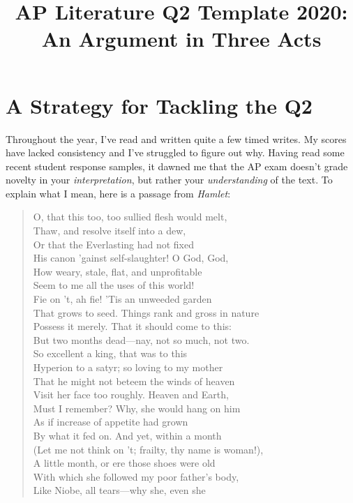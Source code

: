 \documentclass[11pt]{article}
\title{AP Literature Q2 Template 2020: An Argument in Three Acts}
\begin{document}
\maketitle

\section{A Strategy for Tackling the Q2}
Throughout the year, I've read and written quite a few timed writes. 
My scores have lacked consistency and I've struggled to figure out why.
Having read some recent student response samples, it dawned me that the AP exam doesn't grade novelty in your \textit{interpretation}, but rather your \textit{understanding} of the text.
To explain what I mean, here is a passage from \textit{Hamlet}:
\begin{quote}
	\small{O, that this too, too sullied flesh would melt,\\
Thaw, and resolve itself into a dew,\\
Or that the Everlasting had not fixed\\
His canon ’gainst self-slaughter! O God, God,\\
How weary, stale, flat, and unprofitable\\
Seem to me all the uses of this world!\\
Fie on ’t, ah fie! ’Tis an unweeded garden\\
That grows to seed. Things rank and gross in nature\\
Possess it merely. That it should come to this:\\
But two months dead—nay, not so much, not two.\\
So excellent a king, that was to this\\
Hyperion to a satyr; so loving to my mother\\
That he might not beteem the winds of heaven\\
Visit her face too roughly. Heaven and Earth,\\
Must I remember? Why, she would hang on him\\
As if increase of appetite had grown\\
By what it fed on. And yet, within a month\\
(Let me not think on ’t; frailty, thy name is woman!),\\
A little month, or ere those shoes were old\\
With which she followed my poor father’s body,\\
Like Niobe, all tears—why she, even she\\
}
\end{quote}
\end{document}
